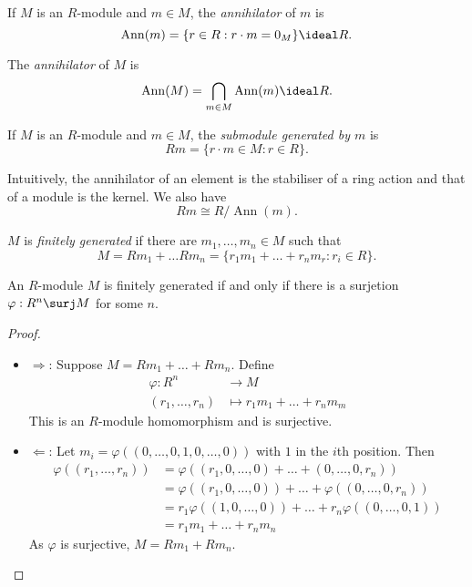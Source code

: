 \documentclass[a4paper]{article}
\DeclareMathOperator{\Ann}{Ann}
\begin{document}
\begin{definition}[Annihilator]
  If \(M\) is an \(R\)-module and \(m \in M\), the \emph{annihilator} of \(m\) is
  \[
    \Ann(m) = \{r \in R: r \cdot m = 0_M\} \ideal R.
  \]

  The \emph{annihilator} of \(M\) is
  \[
    \Ann(M) = \bigcap_{m \in M} \Ann(m) \ideal R.
  \]
\end{definition}

\begin{definition}
  If \(M\) is an \(R\)-module and \(m \in M\), the \emph{submodule generated by \(m\)} is
  \[
    Rm = \{r \cdot m \in M: r \in R\}.
  \]
\end{definition}

\begin{note}
  Intuitively, the annihilator of an element is the stabiliser of a ring action and that of a module is the kernel. We also have
  \[
    Rm \cong R/\Ann(m).
  \]
\end{note}

\begin{definition}
  \(M\) is \emph{finitely generated} if there are \(m_1, \dots, m_n \in M\) such that
  \[
    M = Rm_1 + \dots Rm_n = \{r_1m_1 + \dots + r_nm_r: r_i \in R\}.
  \]
\end{definition}

\begin{lemma}
  An \(R\)-module \(M\) is finitely generated if and only if there is a surjetion \(\varphi: R^n \surj M\) for some \(n\).
\end{lemma}

\begin{proof}\leavevmode
  \begin{itemize}
  \item \(\Rightarrow\): Suppose \(M = Rm_1 + \dots + Rm_n\). Define
    \begin{align*}
      \varphi: R^n &\to M \\
      (r_1, \dots, r_n) &\mapsto r_1m_1 + \dots + r_nm_m
    \end{align*}
    This is an \(R\)-module homomorphism and is surjective.
  \item \(\Leftarrow\): Let \(m_i = \varphi((0, \dots, 0, 1, 0, \dots, 0))\) with \(1\) in the \(i\)th position. Then
    \begin{align*}
      \varphi((r_1, \dots, r_n)) &= \varphi((r_1, 0, \dots, 0) + \dots + (0, \dots, 0, r_n)) \\
                                 &= \varphi((r_1, 0, \dots, 0)) + \dots + \varphi((0, \dots, 0, r_n)) \\
                                 &= r_1 \varphi((1, 0, \dots, 0)) + \dots + r_n \varphi((0, \dots, 0, 1)) \\
      &= r_1m_1 + \dots + r_nm_n
    \end{align*}
    As \(\varphi\) is surjective, \(M = Rm_1 + Rm_n\).
  \end{itemize}
\end{proof}
\end{document}
